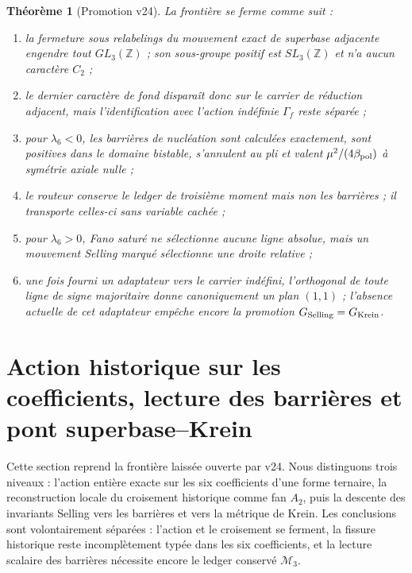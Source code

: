 \documentclass[11pt,a4paper]{article}
\newtheorem{theorem}{Théorème}[section]
\begin{document}
\begin{theorem}[Promotion v24]\label{thm:v24-verdict}
La frontière se ferme comme suit :
\begin{enumerate}[label=\textup{(\roman*)}]
\item la fermeture sous relabelings du mouvement exact de superbase adjacente engendre tout $GL_3(\mathbb Z)$ ; son sous-groupe positif est $SL_3(\mathbb Z)$ et n'a aucun caractère $C_2$ ;
\item le dernier caractère de fond disparaît donc sur le carrier de réduction adjacent, mais l'identification avec l'action indéfinie $\Gamma_f$ reste séparée ;
\item pour $\lambda_6<0$, les barrières de nucléation sont calculées exactement, sont positives dans le domaine bistable, s'annulent au pli et valent $\mu^2/(4\beta_{\rm pol})$ à symétrie axiale nulle ;
\item le routeur conserve le ledger de troisième moment mais non les barrières ; il transporte celles-ci sans variable cachée ;
\item pour $\lambda_6>0$, Fano saturé ne sélectionne aucune ligne absolue, mais un mouvement Selling marqué sélectionne une droite relative ;
\item une fois fourni un adaptateur vers le carrier indéfini, l'orthogonal de toute ligne de signe majoritaire donne canoniquement un plan $(1,1)$ ; l'absence actuelle de cet adaptateur empêche encore la promotion $G_{\rm Selling}=G_{\rm Krein}$.
\end{enumerate}
\end{theorem}


\section{Action historique sur les coefficients, lecture des barrières et pont superbase--Krein}\label{sec:v25-historical-action-barrier-krein-bridge}

Cette section reprend la frontière laissée ouverte par v24. Nous distinguons trois niveaux : l'action entière exacte sur les six coefficients d'une forme ternaire, la reconstruction locale du croisement historique comme fan $A_2$, puis la descente des invariants Selling vers les barrières et vers la métrique de Krein. Les conclusions sont volontairement séparées : l'action et le croisement se ferment, la fissure historique reste incomplètement typée dans les six coefficients, et la lecture scalaire des barrières nécessite encore le ledger conservé $\mathcal M_3$.
\end{document}
